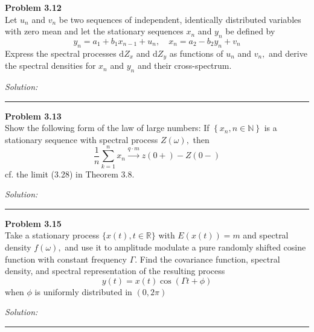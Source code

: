 \documentclass[a4paper, 11pt]{article}
\newenvironment{problem}[2][Problem]
    { \begin{mdframed}[backgroundcolor=gray!20] \textbf{#1 #2} \\}
    {  \end{mdframed}}
\newenvironment{solution}
    {\textit{Solution:}}
    {}
\begin{document}
\begin{problem}{3.12}
Let $u_{n}$ and $v_{n}$ be two sequences of independent, identically distributed variables with zero mean and let the stationary sequences $x_{n}$ and $y_{n}$ be defined by
\[
y_{n}=a_{1}+b_{1} x_{n-1}+u_{n}, \quad x_{n}=a_{2}-b_{2} y_{n}+v_{n}
\]
Express the spectral processes $\mathrm{d} Z_{x}$ and $\mathrm{d} Z_{y}$ as functions of $u_{n}$ and $v_{n},$ and derive the spectral densities for $x_{n}$ and $y_{n}$ and their cross-spectrum.

\end{problem}
\begin{solution}

\end{solution} 
%
\noindent\rule{7in}{2.8pt}

\begin{problem}{3.13}
Show the following form of the law of large numbers: If $\left\{x_{n}, n \in \mathbb{N}\right\}$ is a stationary sequence with spectral process $Z(\omega),$ then
\[
\frac{1}{n} \sum_{k=1}^{n} x_{n} \stackrel{q \cdot m}{\rightarrow} z(0+)-Z(0-)
\]
cf. the limit (3.28) in Theorem 3.8.

\end{problem}
\begin{solution}



\end{solution} 
%
\noindent\rule{7in}{2.8pt}

\begin{problem}{3.15}
Take a stationary process $\{x(t), t \in \mathbb{R}\}$ with $E(x(t))=m$ and spectral density $f(\omega),$ and use it to amplitude modulate a pure randomly shifted cosine function with constant frequency $\Gamma$. Find the covariance function, spectral density, and spectral representation of the resulting process
\[
y(t)=x(t) \cos (\Gamma t+\phi)
\]
when $\phi$ is uniformly distributed in $(0,2 \pi)$

\end{problem}
\begin{solution}



	
\end{solution} 
%
\noindent\rule{7in}{2.8pt}




\end{document}
